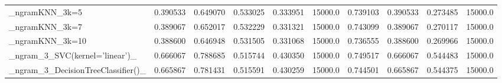 \begin{tabular}{lrrrrrrrrr}
\_ngramKNN\_3k=5                                     &  0.390533 &         0.649070 &      0.533025 &        0.333951 &        15000.0 &            0.739103 &         0.390533 &           0.273485 &           15000.0 \\
\_ngramKNN\_3k=7                                     &  0.389067 &         0.652017 &      0.532229 &        0.331321 &        15000.0 &            0.743099 &         0.389067 &           0.270117 &           15000.0 \\
\_ngramKNN\_3k=10                                    &  0.388600 &         0.646948 &      0.531505 &        0.331068 &        15000.0 &            0.736555 &         0.388600 &           0.269966 &           15000.0 \\
\_ngram\_3\_SVC(kernel='linear')\_                     &  0.666067 &         0.788685 &      0.515744 &        0.430350 &        15000.0 &            0.749517 &         0.666067 &           0.544483 &           15000.0 \\
\_ngram\_3\_DecisionTreeClassifier()\_                 &  0.665867 &         0.781431 &      0.515591 &        0.430259 &        15000.0 &            0.744501 &         0.665867 &           0.544375 &           15000.0 \\
\bottomrule
\end{tabular}
